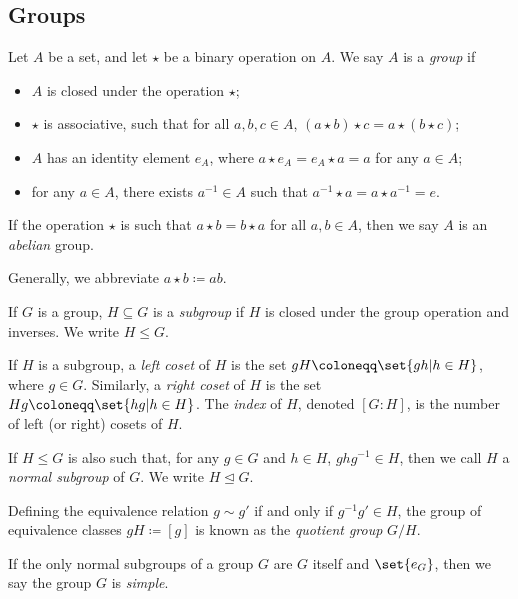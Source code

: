 \subsection{Groups}%
\begin{definition}[Groups]
  Let $A$ be a set, and let $\star$ be a binary operation on $A$. We say $A$ is a \textit{group} if
  \begin{itemize}
    \item $A$ is closed under the operation $\star$;
    \item $\star$ is associative, such that for all $a,b,c\in A$, $\left(a\star b\right)\star c = a\star \left(b\star c\right)$;
    \item $A$ has an identity element $e_A$, where $a\star e_A = e_A\star a = a$ for any $a\in A$;
    \item for any $a\in A$, there exists $a^{-1}\in A$ such that $a^{-1}\star a = a\star a^{-1} = e$.
  \end{itemize}
  If the operation $\star$ is such that $a\star b = b\star a$ for all $a,b\in A$, then we say $A$ is an \textit{abelian} group.
\end{definition}
\begin{remark}
  Generally, we abbreviate $a\star b \coloneq ab$.
\end{remark}
\begin{definition}
  If $G$ is a group, $H\subseteq G$ is a \textit{subgroup} if $H$ is closed under the group operation and inverses. We write $H\leq G$.\newline

  If $H$ is a subgroup, a \textit{left coset} of $H$ is the set $gH \coloneq \set{gh | h\in H}$, where $g\in G$. Similarly, a \textit{right coset} of $H$ is the set $Hg\coloneq \set{hg | h\in H}$. The \textit{index} of $H$, denoted $\left[G:H\right]$, is the number of left (or right) cosets of $H$.\newline

  If $H\leq G$ is also such that, for any $g\in G$ and $h\in H$, $ghg^{-1}\in H$, then we call $H$ a \textit{normal subgroup} of $G$. We write $H\trianglelefteq G$.\newline

  Defining the equivalence relation $g\sim g'$ if and only if $g^{-1}g'\in H$, the group of equivalence classes $gH\coloneq \left[g\right]$ is known as the \textit{quotient group} $G/H$.\newline

  If the only normal subgroups of a group $G$ are $G$ itself and $\set{e_{G}}$, then we say the group $G$ is \textit{simple}.
\end{definition}
